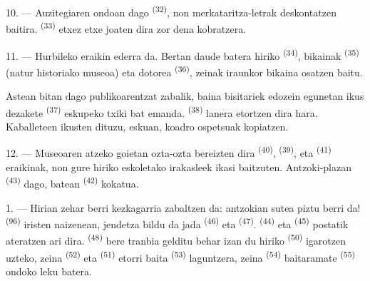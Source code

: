 10. --- Auzitegiaren ondoan  dago \textsuperscript{(32)}, non
merkataritza-letrak deskontatzen baitira. 
\textsuperscript{(33)} etxez etxe joaten dira zor dena kobratzera.

\VUsaut{4.0mm}
\VUsaut{3.4mm}

11. --- Hurbileko eraikin ederra  da. Bertan daude batera hiriko
 \textsuperscript{(34)}, 
bikainak \textsuperscript{(35)} (natur historiako museoa) eta 
dotorea \textsuperscript{(36)}, zeinak  iraunkor bikaina
osatzen baitu.

Astean bitan dago publikoarentzat zabalik, baina bisitariek edozein egunetan
ikus dezakete  \textsuperscript{(37)} eskupeko txiki bat
emanda.  \textsuperscript{(38)} lanera etortzen dira hara.
Kaballeteen  ikusten dituzu,  eskuan, koadro
ospetsuak kopiatzen.

12. --- Museoaren atzeko goietan ozta-ozta bereizten dira 
\textsuperscript{(40)},  \textsuperscript{(39)}, eta
 \textsuperscript{(41)} eraikinak, non gure hiriko
eskoletako irakasleek ikasi baitzuten. Antzoki-plazan 
\textsuperscript{(43)} dago,  batean
\textsuperscript{(42)} kokatua.

\VUsaut{5.0mm}
\VUsaut{3.0mm}

\VUsaut{3.4mm}

1. --- Hirian zehar berri kezkagarria zabaltzen da: antzokian sutea piztu berri
da!  \textsuperscript{(96)} iristen naizenean, jendetza bildu da
jada  \textsuperscript{(46)} eta 
\textsuperscript{(47)}.  \textsuperscript{(44)}
eta  \textsuperscript{(45)} postatik ateratzen ari dira.
 \textsuperscript{(48)} bere tranbia gelditu behar izan
du hiriko  \textsuperscript{(50)} igarotzen uzteko, zeina
 \textsuperscript{(52)} eta 
\textsuperscript{(51)} etorri baita  \textsuperscript{(53)}
laguntzera, zeina  \textsuperscript{(54)} baitaramate
 \textsuperscript{(55)} ondoko leku batera.


